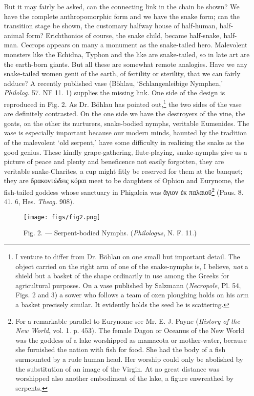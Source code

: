 \documentclass[a4paper, 11pt, oneside, polutonikogreek, english]{article}
\begin{document}
But it may fairly be asked, can the connecting link in the chain be shown? We have the complete anthropomorphic form and we have the snake form; can the transition stage be shown, the customary halfway house of half-human, half-animal form? Erichthonios of course, the snake child, became half-snake, half-man. Cecrops appears on many a monument as the snake-tailed hero. Malevolent monsters like the Echidna, Typhon and the like are snake-tailed, so in late art are the earth-born giants. But all these are somewhat remote analogies. Have we any snake-tailed women genii of the earth, of fertility or sterility, that we can fairly adduce? A recently published vase (Böhlau, `Schlangenleibige Nymphen,' \emph{Philolog.} 57. NF 11. 1) supplies the missing link. One side of the design is reproduced in Fig. 2. As Dr. Böhlau has pointed out,\footnote{I venture to differ from Dr. Böhlau on one small but important detail. The object carried on the right arm of one of the snake-nymphs is, I believe, \emph{not} a shield but a basket of the shape ordinarily in use among the Greeks for agricultural purposes. On a vase published by Salzmann (\emph{Necropole}, Pl. 54, Figs. 2 and 3) a sower who follows a team of oxen ploughing holds on his arm a basket precisely similar. It evidently holds the seed he is scattering.} the two sides of the vase are definitely contrasted. On the one side we have the destroyers of the vine, the goats, on the other its nurturers, snake-bodied nymphs, veritable Eumenides. The vase is especially important because our modern minds, haunted by the tradition of the malevolent `old serpent,' have some difficulty in realizing the snake as the good genius. These kindly grape-gathering, flute-playing, snake-nymphs give us a picture of peace and plenty and beneficence not easily forgotten, they are veritable snake-Charites, a cup might fitly be reserved for them at the banquet; they are δρακοντώδεις κόραι meet to be daughters of Ophion and Eurynome, the fish-tailed goddess whose sanctuary in Phigaleia was ἅγιον ἐκ παλαιοῦ\footnote{For a remarkable parallel to Eurynome see Mr. E. J. Payne (\emph{History of the New World}, vol. 1. p. 453). The female Dagon or Oceanus of the New World was the goddess of a lake worshipped as mamacota or mother-water, because she furnished the nation with fish for food. She had the body of a fish surmounted by a rude human head. Her worship could only be abolished by the substitution of an image of the Virgin. At no great distance was worshipped also another embodiment of the lake, a figure enwreathed by serpents.} (Paus. 8. 41. 6, Hes. \emph{Theog.} 908).
\begin{figure}[H]
\centering
\texttt{[image: figs/fig2.png]}
\caption{Fig. 2. --- Serpent-bodied Nymphs. (\emph{Philologus}, N. F. 11.)}
\end{figure}
\end{document}
